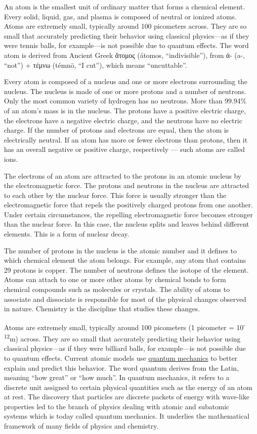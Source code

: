 \documentclass[
]{article}
\begin{document}
An atom is the smallest unit of ordinary matter that forms a chemical
element. Every solid, liquid, gas, and plasma is composed of neutral or
ionized atoms. Atoms are extremely small, typically around 100
picometers across. They are so small that accurately predicting their
behavior using classical physics---as if they were tennis balls, for
example---is not possible due to quantum effects. The word atom is
derived from Ancient Greek ἄτομος (átomos, ``indivisible''), from ἀ-
(a-, ``not'') + τέμνω (témnō, ``I cut''), which means ``uncuttable''.

Every atom is composed of a nucleus and one or more electrons
surrounding the nucleus. The nucleus is made of one or more protons and
a number of neutrons. Only the most common variety of hydrogen has no
neutrons. More than 99.94\% of an atom's mass is in the nucleus. The
protons have a positive electric charge, the electrons have a negative
electric charge, and the neutrons have no electric charge. If the number
of protons and electrons are equal, then the atom is electrically
neutral. If an atom has more or fewer electrons than protons, then it
has an overall negative or positive charge, respectively --- such atoms
are called ions.

The electrons of an atom are attracted to the protons in an atomic
nucleus by the electromagnetic force. The protons and neutrons in the
nucleus are attracted to each other by the nuclear force. This force is
usually stronger than the electromagnetic force that repels the
positively charged protons from one another. Under certain
circumstances, the repelling electromagnetic force becomes stronger than
the nuclear force. In this case, the nucleus splits and leaves behind
different elements. This is a form of nuclear decay.

The number of protons in the nucleus is the atomic number and it defines
to which chemical element the atom belongs. For example, any atom that
contains 29 protons is copper. The number of neutrons defines the
isotope of the element. Atoms can attach to one or more other atoms by
chemical bonds to form chemical compounds such as molecules or crystals.
The ability of atoms to associate and dissociate is responsible for most
of the physical changes observed in nature. Chemistry is the discipline
that studies these changes.

Atoms are extremely small, typically around 100 picometers (1 picometer
= 10\textsuperscript{-12}m) across. They are so small that accurately
predicting their behavior using classical physics---as if they were
billiard balls, for example---is not possible due to quantum effects.
Current atomic models use
\href{https://en.wikipedia.org/wiki/Quantum_mechanics}{quantum
mechanics} to better explain and predict this behavior. The word quantum
derives from the Latin, meaning ``how great'' or ``how much''. In
quantum mechanics, it refers to a discrete unit assigned to certain
physical quantities such as the energy of an atom at rest. The discovery
that particles are discrete packets of energy with wave-like properties
led to the branch of physics dealing with atomic and subatomic systems
which is today called quantum mechanics. It underlies the mathematical
framework of many fields of physics and chemistry.
\end{document}

